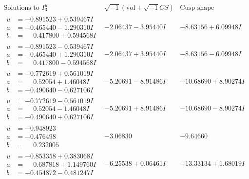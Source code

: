 \documentclass[1p]{elsarticle_modified}
\theoremstyle{definition}
\newcommand{\I}{\sqrt{-1}}
\begin{document}
$$\begin{array}{c|c|c}  
\text{Solutions to }I^u_{3}& \I (\text{vol} + \sqrt{-1}CS) & \text{Cusp shape}\\
 \hline 
\begin{aligned}
u &= -0.891523 + 0.539467 I \\
a &= -0.465440 - 1.290310 I \\
b &= \phantom{-}0.417800 + 0.594568 I\end{aligned}
 & -2.06437 - 3.95440 I & -8.63156 + 6.09948 I \\ \hline\begin{aligned}
u &= -0.891523 - 0.539467 I \\
a &= -0.465440 + 1.290310 I \\
b &= \phantom{-}0.417800 - 0.594568 I\end{aligned}
 & -2.06437 + 3.95440 I & -8.63156 - 6.09948 I \\ \hline\begin{aligned}
u &= -0.772619 + 0.561019 I \\
a &= \phantom{-}0.52054 + 1.46048 I \\
b &= -0.490640 - 0.627106 I\end{aligned}
 & -5.20691 - 8.91486 I & -10.68690 + 8.90274 I \\ \hline\begin{aligned}
u &= -0.772619 - 0.561019 I \\
a &= \phantom{-}0.52054 - 1.46048 I \\
b &= -0.490640 + 0.627106 I\end{aligned}
 & -5.20691 + 8.91486 I & -10.68690 - 8.90274 I \\ \hline\begin{aligned}
u &= -0.948923\phantom{ +0.000000I} \\
a &= -0.476498\phantom{ +0.000000I} \\
b &= \phantom{-}0.232005\phantom{ +0.000000I}\end{aligned}
 & -3.06830\phantom{ +0.000000I} & -9.64660\phantom{ +0.000000I} \\ \hline\begin{aligned}
u &= -0.853358 + 0.383068 I \\
a &= \phantom{-}0.687818 + 1.149760 I \\
b &= -0.454872 - 0.481247 I\end{aligned}
 & -6.25538 + 0.06461 I & -13.33134 + 1.68019 I \\ \hline\begin{aligned}

\end{aligned}
\end{array}$$
\end{document}
